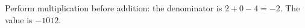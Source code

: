 Perform multiplication before addition: the denominator is $2+0-4=-2$. The value is $\boxed{-1012}$.
